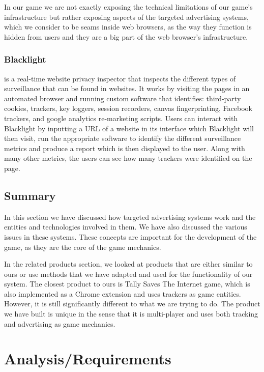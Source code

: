 \documentclass{l4proj}
\begin{document}
In our game we are not exactly exposing the technical limitations of our game's infrastructure but rather exposing aspects of the targeted advertising systems, which we consider to be seams inside web browsers, as the way they function is hidden from users and they are a big part of the web browser's infrastructure.

\subsection{Blacklight}
\cite{blight} is a real-time website privacy inspector that inspects the different types of surveillance that can be found in websites. It works by visiting the pages in an automated browser and running custom software that identifies: third-party cookies, trackers, key loggers, session recorders, canvas fingerprinting, Facebook trackers, and google analytics re-marketing scripts. Users can interact with Blacklight by inputting a URL of a website in its interface which Blacklight will then visit, run the appropriate software to identify the different surveillance metrics and produce a report which is then displayed to the user. Along with many other metrics, the users can see how many trackers were identified on the page.

\section{Summary}
In this section we have discussed how targeted advertising systems work and the entities and technologies involved in them. We have also discussed the various issues in these systems. These concepts are important for the development of the game, as they are the core of the game mechanics. 

In the related products section, we looked at products that are either similar to ours or use methods that we have adapted and used for the functionality of our system. The closest product to ours is Tally Saves The Internet game, which is also implemented as a Chrome extension and uses trackers as game entities. However, it is still significantly different to what we are trying to do. The product we have built is unique in the sense that it is multi-player and uses both tracking and advertising as game mechanics. 

\chapter{Analysis/Requirements}
\end{document}
